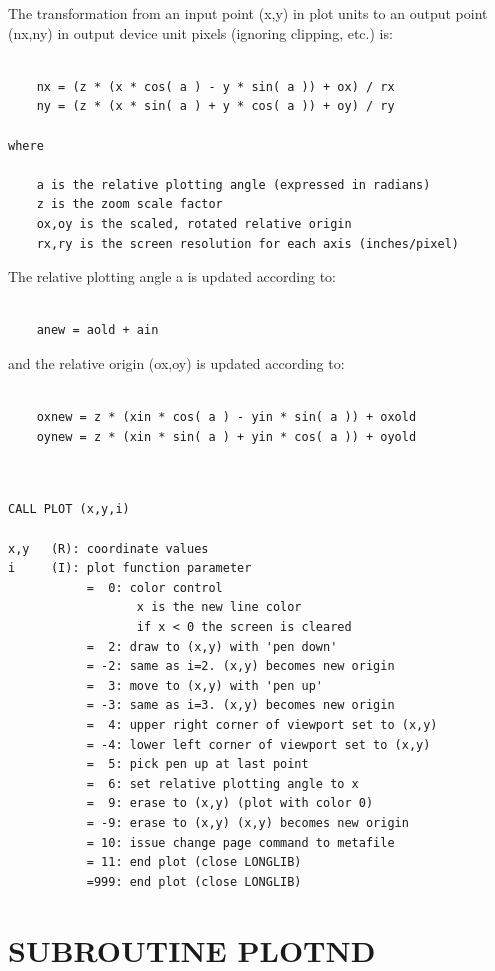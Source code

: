 \documentclass[11pt]{report}
\begin{document}
The transformation from an input point (x,y) in plot units to an output point
(nx,ny) in output device unit pixels (ignoring clipping, etc.) is:
\begin{verbatim}

    nx = (z * (x * cos( a ) - y * sin( a )) + ox) / rx
    ny = (z * (x * sin( a ) + y * cos( a )) + oy) / ry

where

    a is the relative plotting angle (expressed in radians)
    z is the zoom scale factor
    ox,oy is the scaled, rotated relative origin
    rx,ry is the screen resolution for each axis (inches/pixel)

\end{verbatim}
The relative plotting angle a is updated according to:
\begin{verbatim}

    anew = aold + ain

\end{verbatim}
and the relative origin (ox,oy) is updated according to:
\begin{verbatim}

    oxnew = z * (xin * cos( a ) - yin * sin( a )) + oxold
    oynew = z * (xin * sin( a ) + yin * cos( a )) + oyold
	
\end{verbatim}
\begin{verbatim}

CALL PLOT (x,y,i)

x,y   (R): coordinate values
i     (I): plot function parameter
           =  0: color control
                  x is the new line color
                  if x < 0 the screen is cleared
           =  2: draw to (x,y) with 'pen down'
           = -2: same as i=2. (x,y) becomes new origin
           =  3: move to (x,y) with 'pen up'
           = -3: same as i=3. (x,y) becomes new origin
           =  4: upper right corner of viewport set to (x,y)
           = -4: lower left corner of viewport set to (x,y)
           =  5: pick pen up at last point
           =  6: set relative plotting angle to x
           =  9: erase to (x,y) (plot with color 0)
           = -9: erase to (x,y) (x,y) becomes new origin
           = 10: issue change page command to metafile
           = 11: end plot (close LONGLIB)
           =999: end plot (close LONGLIB)
\end{verbatim}

\section{SUBROUTINE PLOTND}
\end{document}
